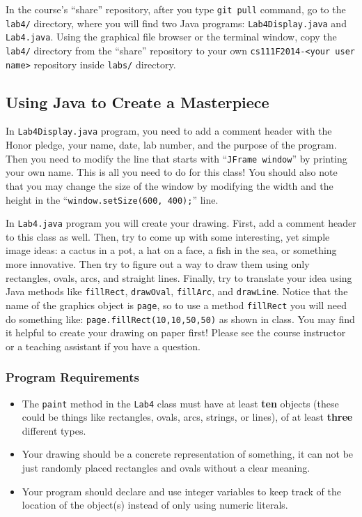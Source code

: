 In the course's ``share'' repository, after you type {\tt git pull} command, go to the {\tt lab4/} directory, where you
will find two Java programs: {\tt Lab4Display.java} and {\tt Lab4.java}. Using the graphical file browser or the
terminal window, copy the {\tt lab4/} directory from the ``share'' repository to your own {\tt cs111F2014-<your user
name>} repository inside {\tt labs/} directory.

\subsection*{Using Java to Create a Masterpiece}

In {\tt Lab4Display.java} program, you need to add a comment header with the Honor pledge, your name, date, lab number,
and the purpose of the program. Then you need to modify the line that starts with ``{\tt JFrame window}'' by printing
your own name. This is all you need to do for this class! You should also note that you may change the size of the
window by modifying the width and the height in the ``{\tt window.setSize(600, 400);}'' line. 

In {\tt Lab4.java} program you will create your drawing. First, add a comment header to this class as well.  Then, try
to come up with some interesting, yet simple image ideas: a cactus in a pot, a hat on a face, a fish in the sea, or
something more innovative.  Then try to figure out a way to draw them using only rectangles, ovals, arcs, and straight
lines.  Finally, try to translate your idea using Java methods like {\tt fillRect}, {\tt drawOval}, {\tt fillArc}, and
{\tt drawLine}. Notice that the name of the graphics object is {\tt page}, so to use a method {\tt fillRect} you will
need do something like: {\tt page.fillRect(10,10,50,50)} as shown in class.  You may find it helpful to create your
drawing on paper first! Please see the course instructor or a teaching assistant if you have a question.

\subsubsection*{Program Requirements}
\begin{itemize}
\item The {\tt paint} method in the {\tt Lab4} class must have at least \textbf{ten} objects (these could be things like rectangles, ovals, arcs, strings, or lines), of at least \textbf{three} different types.
\item Your drawing should be a concrete representation of something, it can not be just randomly placed rectangles and
  ovals without a clear meaning. 
\item Your program should declare and use integer variables to keep track of
the location of the object(s) instead of only using numeric literals. 
\end{itemize}

